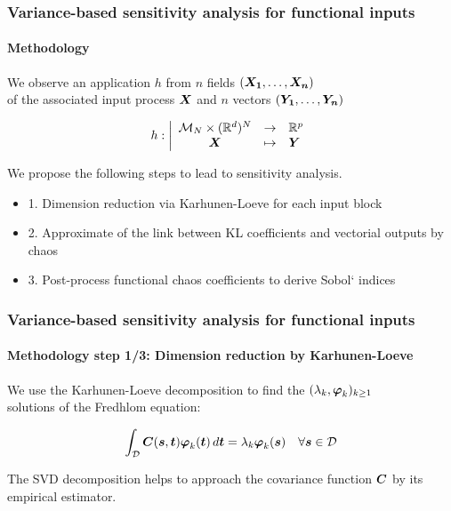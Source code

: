 \documentclass[aspectratio=169]{beamer}
\begin{document}
\begin{frame}
\frametitle{Variance-based sensitivity analysis for functional inputs}

\framesubtitle{Methodology}

We observe an application $h$ from $n$ fields $({{\mathbf{\boldsymbol{{{\mathbf{\boldsymbol{{X_1}}}}}}}}}, \dots, {{\mathbf{\boldsymbol{{{\mathbf{\boldsymbol{{X_n}}}}}}}}})$ \\
of the associated input process ${{\mathbf{\boldsymbol{{{\mathbf{\boldsymbol{{X}}}}}}}}}$ and $n$ vectors $({\mathbf{\boldsymbol{{Y_1}}}},\dots,{\mathbf{\boldsymbol{{Y_n}}}})$

$$
h: \left|
  \begin{array}{ccl}
      {\mathcal M}_N \times (\mathbb{R}^d)^N & \rightarrow & \mathbb{R}^p \\
      {{\mathbf{\boldsymbol{{{\mathbf{\boldsymbol{{X}}}}}}}}} & \mapsto & {\mathbf{\boldsymbol{{Y}}}}
  \end{array}
\right.
$$

\vspace{10mm}

We propose the following steps to lead to sensitivity analysis.

\begin{itemize}
\item 1. Dimension reduction via Karhunen-Loeve for each input block
\item 2. Approximate of the link between KL coefficients and vectorial outputs by chaos
\item 3. Post-process functional chaos coefficients to derive Sobol` indices
\end{itemize}

\end{frame}


% 
% 
% 
% 


\begin{frame}
\frametitle{Variance-based sensitivity analysis for functional inputs}

\framesubtitle{Methodology step 1/3: Dimension reduction by Karhunen-Loeve}

We use the Karhunen-Loeve decomposition to find the $(\lambda_k, {\mathbf{\boldsymbol{{\varphi}}}}_k)_{k \geq 1}$ \\
solutions of the Fredhlom equation:

$$
\int_{{\mathcal D}} {{\mathbf{\boldsymbol{{{\mathbf{\boldsymbol{{C}}}}}}}}}({\mathbf{\boldsymbol{{s}}}},{\mathbf{\boldsymbol{{t}}}}) {\mathbf{\boldsymbol{{\varphi}}}}_k({\mathbf{\boldsymbol{{t}}}})\,  d{\mathbf{\boldsymbol{{t}}}} = \lambda_k  {\mathbf{\boldsymbol{{\varphi}}}}_k({\mathbf{\boldsymbol{{s}}}}) \quad \forall {\mathbf{\boldsymbol{{s}}}} \in {\mathcal D}
$$

The SVD decomposition helps to approach the covariance function ${{\mathbf{\boldsymbol{{{\mathbf{\boldsymbol{{C}}}}}}}}}$ by its empirical estimator.

\end{frame}
\end{document}
